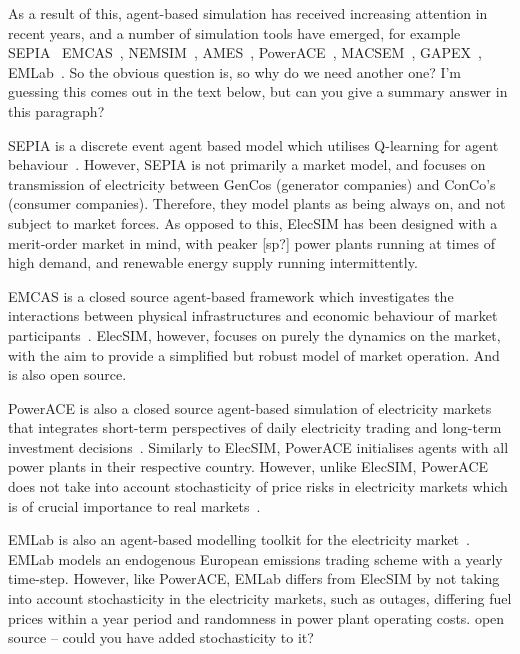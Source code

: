 As a result of this, agent-based simulation has received increasing attention in recent years, and a number of simulation tools have emerged, for example SEPIA~\cite{Kraan2018} EMCAS~\cite{Conzelmann}, NEMSIM~\cite{Batten2006}, AMES~\cite{Sun2007}, PowerACE~\cite{Rothengatter2007}, MACSEM~\cite{Praca2003}, GAPEX~\cite{Cincotti2013}, EMLab~\cite{Chappin2017}. {\color{red}So the obvious question is, so why do we need another one? I'm guessing this comes out in the text below, but can you give a summary answer in this paragraph?}

SEPIA is a discrete event agent based model which utilises Q-learning for agent behaviour~\cite{Harp2000}. However, SEPIA is not primarily a market model, and focuses on transmission of electricity between GenCos (generator companies) and ConCo's (consumer companies). Therefore, they model plants as being always on, and not subject to market forces. As opposed to this, ElecSIM has been designed with a merit-order market in mind, with {\color{red}peaker [sp?]} power plants running at times of high demand, and renewable energy supply running intermittently.

EMCAS is a closed source agent-based framework which investigates the interactions between physical infrastructures and economic behaviour of market participants~\cite{Conzelmann}. ElecSIM, however, focuses on purely the dynamics on the market, with the aim to provide a simplified but robust model of market operation. And is also open source.

PowerACE is also a closed source agent-based simulation of electricity markets that integrates short-term perspectives of daily electricity trading and long-term investment decisions~\cite{Rothengatter2007}. Similarly to ElecSIM, PowerACE initialises agents with all power plants in their respective country. However, unlike ElecSIM, PowerACE does not take into account stochasticity of price risks in electricity markets which is of crucial importance to real markets~\cite{Most2010}.

EMLab is also an agent-based modelling toolkit for the electricity market~\cite{Chappin2017}. EMLab models an endogenous European emissions trading scheme with a yearly time-step. However, like PowerACE, EMLab differs from ElecSIM by not taking into account stochasticity in the electricity markets, such as outages, differing fuel prices within a year period and randomness in power plant operating costs. {\color{red} open source -- could you have added stochasticity to it?}


